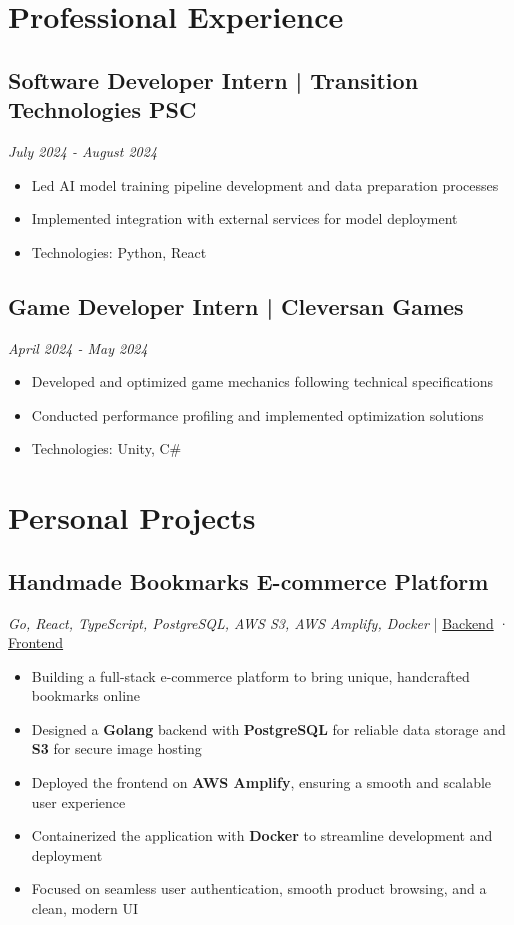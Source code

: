 \documentclass[a4paper,10pt]{article}
\begin{document}
\section{Professional Experience}

\subsection{Software Developer Intern | Transition Technologies PSC}
\textit{July 2024 - August 2024}
\begin{itemize}[leftmargin=0.5cm, nosep]
    \item Led AI model training pipeline development and data preparation processes
    \item Implemented integration with external services for model deployment
    \item Technologies: Python, React
\end{itemize}

\subsection{Game Developer Intern | Cleversan Games}
\textit{April 2024 - May 2024}
\begin{itemize}[leftmargin=0.5cm, nosep]
    \item Developed and optimized game mechanics following technical specifications
    \item Conducted performance profiling and implemented optimization solutions
    \item Technologies: Unity, C\#
\end{itemize}

\section{Personal Projects}

\subsection{Handmade Bookmarks E-commerce Platform}
\textit{Go, React, TypeScript, PostgreSQL, AWS S3, AWS Amplify, Docker} | \href{https://github.com/ZDSDD/zakladki}{Backend} · \href{https://github.com/ZDSDD/zakladki-front}{Frontend}
\begin{itemize}[leftmargin=0.5cm, nosep]
    \item Building a full-stack e-commerce platform to bring unique, handcrafted bookmarks online
    \item Designed a \textbf{Golang} backend with \textbf{PostgreSQL} for reliable data storage and \textbf{S3} for secure image hosting
    \item Deployed the frontend on \textbf{AWS Amplify}, ensuring a smooth and scalable user experience
    \item Containerized the application with \textbf{Docker} to streamline development and deployment
    \item Focused on seamless user authentication, smooth product browsing, and a clean, modern UI
\end{itemize}
\end{document}
